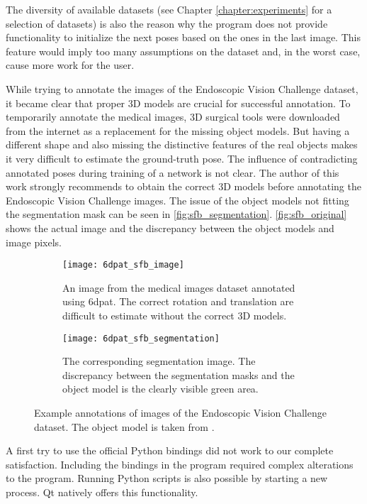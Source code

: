 The diversity of available datasets (see Chapter \ref{chapter:experiments} for a selection of datasets) is also the reason why the program does not provide functionality to initialize the next poses based on the ones in the last image. This feature would imply too many assumptions on the dataset and, in the worst case, cause more work for the user. 

While trying to annotate the images of the Endoscopic Vision Challenge dataset, it became clear that proper 3D models are crucial for successful annotation. To temporarily annotate the medical images, 3D surgical tools were downloaded from the internet as a replacement for the missing object models. But having a different shape and also missing the distinctive features of the real objects makes it very difficult to estimate the ground-truth pose. The influence of contradicting annotated poses during training of a network is not clear. The author of this work strongly recommends to obtain the correct 3D models before annotating the Endoscopic Vision Challenge images. The issue of the object models not fitting the segmentation mask can be seen in \fig \ref{fig:sfb_segmentation}. \fig \ref{fig:sfb_original} shows the actual image and the discrepancy between the object models and image pixels.

\begin{figure}
	\begin{subfigure}[t]{0.47\textwidth}
		\centering
    	\texttt{[image: 6dpat\_sfb\_image]}
    	\caption{An image from the medical images dataset annotated using \ac{6dpat}. The correct rotation and translation are difficult to estimate without the correct 3D models.}
    	\label{fig:6dpat_sfb_image}
	\end{subfigure} 
	\hfill
	\begin{subfigure}[t]{0.47\textwidth}
		\centering
    	\texttt{[image: 6dpat\_sfb\_segmentation]}
    	\caption{The corresponding segmentation image. The discrepancy between the segmentation masks and the object model is the clearly visible green area.}
    	\label{fig:6dpat_sfb_segmentation}
	\end{subfigure} 
	\caption{Example annotations of images of the Endoscopic Vision Challenge dataset. The object model is taken from \cite{3d_scalpel_online}.}
	\label{fig:6dpat_sfb}
\end{figure} 

A first try to use the official Python bindings did not work to our complete satisfaction. Including the bindings in the program required complex alterations to the program. Running Python scripts is also possible by starting a new process. Qt natively offers this functionality.

